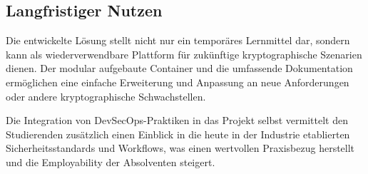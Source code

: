 \documentclass{article}
\begin{document}
\subsection{Langfristiger Nutzen}
Die entwickelte Lösung stellt nicht nur ein temporäres Lernmittel dar, sondern kann als wiederverwendbare Plattform für zukünftige kryptographische Szenarien dienen. Der modular aufgebaute Container und die umfassende Dokumentation ermöglichen eine einfache Erweiterung und Anpassung an neue Anforderungen oder andere kryptographische Schwachstellen.

Die Integration von DevSecOps-Praktiken in das Projekt selbst vermittelt den Studierenden zusätzlich einen Einblick in die heute in der Industrie etablierten Sicherheitsstandards und Workflows, was einen wertvollen Praxisbezug herstellt und die Employability der Absolventen steigert.
\end{document}
